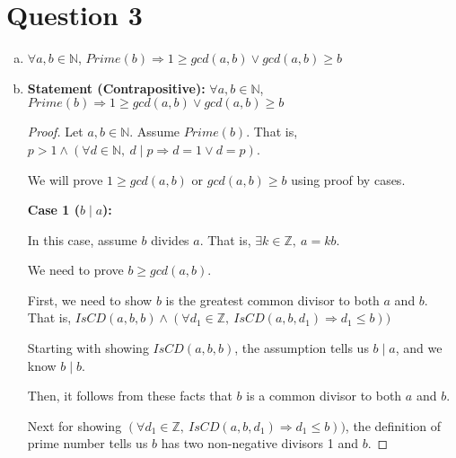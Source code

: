 \documentclass[12pt]{article}
\begin{document}
\section*{Question 3}
\begin{enumerate}[a.]
    \item $\forall a,b \in \mathbb{N}$, $Prime(b) \Rightarrow 1 \geq gcd(a,b) \lor gcd(a,b) \geq b$
    \item

    \textbf{Statement (Contrapositive):} $\forall a,b \in \mathbb{N}$, $Prime(b) \Rightarrow 1 \geq gcd(a,b) \lor gcd(a,b) \geq b$

    \bigskip

    \begin{proof}

        Let $a,b \in \mathbb{N}$. Assume $Prime(b)$. That is, $p > 1 \land (\forall
        d \in \mathbb{N},\:d \mid p \Rightarrow d = 1 \lor d = p)$.

        \bigskip

        We will prove $1 \geq gcd(a,b)$ or $gcd(a,b) \geq b$ using proof by cases.

        \bigskip

        \textbf{Case 1 ($b \mid a$):}

        \bigskip

        In this case, assume $b$ divides $a$. That is, $\exists k \in \mathbb{Z},\:a = kb$.

        \bigskip

        We need to prove $b \geq gcd(a,b)$.

        \bigskip

        First, we need to show $b$ is the greatest common divisor to both $a$ and $b$. That is,
        $IsCD(a,b,b) \land (\forall d_1 \in \mathbb{Z},\:IsCD(a,b,d_1) \Rightarrow d_1 \leq b))$

        \bigskip

        Starting with showing $IsCD(a,b,b)$, the assumption tells us
        $b \mid a$, and we know $b \mid b$.

        \bigskip

        Then, it follows from these facts that $b$ is a common divisor to
        both $a$ and $b$.

        \bigskip

        Next for showing $(\forall d_1 \in \mathbb{Z},\:IsCD(a,b,d_1)
        \Rightarrow d_1 \leq b))$, the definition of prime number
        tells us $b$ has two non-negative divisors 1 and $b$.


\end{proof}
\end{enumerate}
\end{document}
